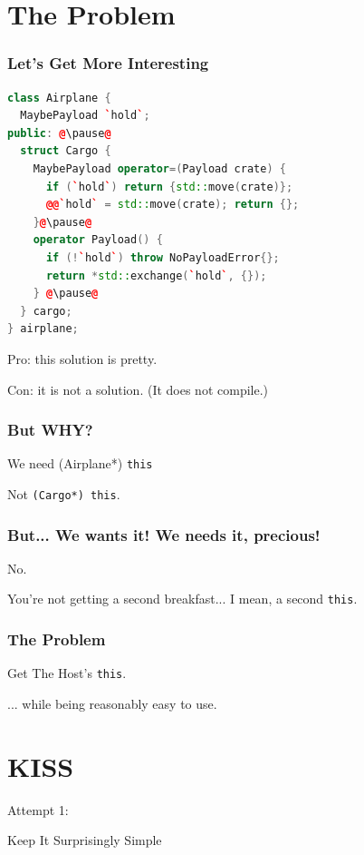 \documentclass{beamer}
\def\code#1{\texttt{#1}}
\newcommand{\this}{\code{this}\xspace}
\newcommand{\nl}{\vspace{0.2\baselineskip}}
\newcommand{\HI}{{\Huge I}{\hspace{-1pt}}}
\newcommand{\HS}{{\Huge S}{\hspace{-1pt}}}
\newcommand{\HK}{{\Huge K}{\hspace{-1pt}}}
\begin{document}
\section{The Problem}

\begin{frame}[fragile]
  \frametitle{Let's Get More Interesting}
\begin{lstlisting}[language=cpp]
class Airplane {
  MaybePayload `hold`;
public: @\pause@
  struct Cargo {
    MaybePayload operator=(Payload crate) {
      if (`hold`) return {std::move(crate)};
      @@`hold` = std::move(crate); return {};
    }@\pause@
    operator Payload() {
      if (!`hold`) throw NoPayloadError{};
      return *std::exchange(`hold`, {});
    } @\pause@
  } cargo;
} airplane;
\end{lstlisting}
\pause
Pro: this solution is pretty.
\pause

Con: it is not a solution. {\tiny (It does not compile.)}
\end{frame}

\begin{frame}
  \frametitle{But WHY?}
\begin{center}
  {\Huge We need (Airplane*) \this}
  \vspace{.8 in} 

  Not \code{(Cargo*) this}.
\end{center}
\end{frame}


\begin{frame}[fragile]
  \frametitle{But... We wants it! We needs it, precious!}

\begin{center}
  {\Huge No.}
  \vspace{.8 in} 

  You're not getting a second breakfast... I mean, a second \this.
\end{center}
\end{frame}


\begin{frame}
  \frametitle{The Problem}

\begin{center}
  {\Huge Get The Host's \this.} \nl

  ... while being reasonably easy to use.
\end{center}
\end{frame}


\section{KISS}
\begin{frame}
\begin{center}
  Attempt 1:\nl\nl

  \HK eep \HI t \HS urprisingly \HS imple
\end{center}
\end{frame}
\end{document}
